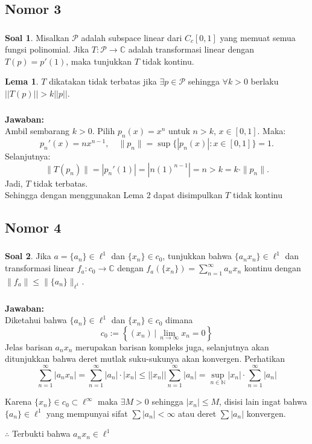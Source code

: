 \documentclass[aspectratio=169]{beamer}
\theoremstyle{definition}
\newtheorem{lema}{Lema}
\newtheorem{soal}{Soal}
\newcommand{\N}{\mathbb{N}}
\begin{document}
\subsection{Nomor 3}
\begin{frame}
  \frametitle{\insertsection}
  \begin{soal}
    Misalkan $\mathcal{P}$ adalah subspace linear dari $C_c[0,1]$ yang memuat semua fungsi polinomial. Jika $T \colon \mathcal{P} \to \mathbb{C}$ adalah transformasi linear dengan $T(p) = p'(1)$, maka tunjukkan $T$ tidak kontinu.  \end{soal}
  \begin{lema}
    $T$ dikatakan tidak terbatas jika $\exists p\in \mathcal{P}$ sehingga $\forall k>0$ berlaku $||T(p)||>k||p||$.
  \end{lema}
\end{frame}
\begin{frame}
  \frametitle{\insertsection}
  \framesubtitle{\insertsubsection}
  \textbf{Jawaban:}\\
  Ambil sembarang $k > 0$. Pilih $p_n(x) = x^n$ untuk $n > k$, $x \in [0,1]$. Maka:
\[
p_n'(x) = nx^{n-1}, \quad \|p_n\| = \sup\{|p_n(x)| : x \in [0,1]\} = 1.
\]
Selanjutnya:
\[
\|T(p_n)\| = |p_n'(1)| = |n(1)^{n-1}| = n > k = k \cdot \|p_n\|.
\]
Jadi, $T$ tidak terbatas.\\

Sehingga dengan menggunakan Lema 2 dapat disimpulkan $T$ tidak kontinu
\end{frame}

\subsection{Nomor 4}
\begin{frame}
  \frametitle{\insertsection}
  \begin{soal}
    Jika $a = \{a_n\} \in \ell^1$ dan $\{x_n\} \in c_0$, tunjukkan bahwa $\{a_n x_n\} \in \ell^1$ dan transformasi linear $f_a \colon c_0 \to \mathbb{C}$ dengan $f_a(\{x_n\}) = \sum_{n=1}^\infty a_n x_n$ kontinu dengan $\|f_a\| \leq \|\{a_n\}\|_{\ell^1}$.
  \end{soal}
\end{frame}

\begin{frame}
  \frametitle{\insertsection}
  \framesubtitle{\insertsubsection}
  \textbf{Jawaban:}\\
  Diketahui bahwa $\{a_n\} \in \ell^1$ dan $\{x_n\} \in c_0$ dimana
    \[c_0:=\left\{(x_n)\,|\,\lim_{n \to \infty} x_n = 0\right\}\]
    Jelas barisan $a_nx_n$ merupakan barisan kompleks juga, selanjutnya akan ditunjukkan bahwa deret mutlak suku-sukunya akan konvergen. Perhatikan
    $$
\sum_{n=1}^\infty |a_n x_n| = \sum_{n=1}^\infty |a_n|\cdot|x_n| \leq ||x_n||\sum_{n=1}^\infty |a_n|=\sup_{n\in\N} |x_n| \cdot \sum_{n=1}^\infty |a_n|
$$

Karena $\{x_n\} \in c_0 \subset \ell^\infty$ maka $\exists M > 0$ sehingga $|x_n| \leq M$, disisi lain ingat bahwa $\{a_n\} \in \ell^1$ yang mempunyai sifat $\sum |a_n| < \infty$ atau deret $\sum |a_n|$ konvergen.

$\therefore$ Terbukti bahwa $a_nx_n\in\ell^1$
\end{frame}
\end{document}
